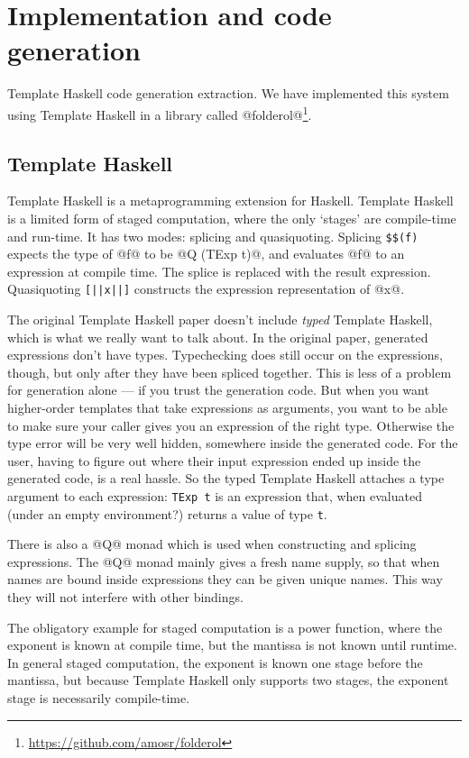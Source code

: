 \chapter{Implementation and code generation}
\label{chapter:process:implementation}

Template Haskell code generation extraction.
We have implemented this system using Template Haskell in a library called @folderol@\footnote{\url{https://github.com/amosr/folderol}}.

\section{Template Haskell}
Template Haskell is a metaprogramming extension for Haskell.
Template Haskell is a limited form of staged computation, where the only `stages' are compile-time and run-time.
It has two modes: splicing and quasiquoting.
Splicing \verb/$$(f)/ expects the type of @f@ to be @Q (TExp t)@, and evaluates @f@ to an expression at compile time.
The splice is replaced with the result expression.
Quasiquoting \lstinline/[||x||]/ constructs the expression representation of @x@.

The original Template Haskell paper \cite{sheard2002template} doesn't include \emph{typed} Template Haskell, which is what we really want to talk about.
In the original paper, generated expressions don't have types.
Typechecking does still occur on the expressions, though, but only after they have been spliced together.
This is less of a problem for generation alone --- if you trust the generation code.
But when you want higher-order templates that take expressions as arguments, you want to be able to make sure your caller gives you an expression of the right type.
Otherwise the type error will be very well hidden, somewhere inside the generated code.
For the user, having to figure out where their input expression ended up inside the generated code, is a real hassle.
So the typed Template Haskell attaches a type argument to each expression: \lstinline|TExp t| is an expression that, when evaluated (under an empty environment?) returns a value of type \lstinline|t|.

There is also a @Q@ monad which is used when constructing and splicing expressions.
The @Q@ monad mainly gives a fresh name supply, so that when names are bound inside expressions they can be given unique names. This way they will not interfere with other bindings.

The obligatory example for staged computation is a power function, where the exponent is known at compile time, but the mantissa is not known until runtime.
In general staged computation, the exponent is known one stage before the mantissa, but because Template Haskell only supports two stages, the exponent stage is necessarily compile-time.

